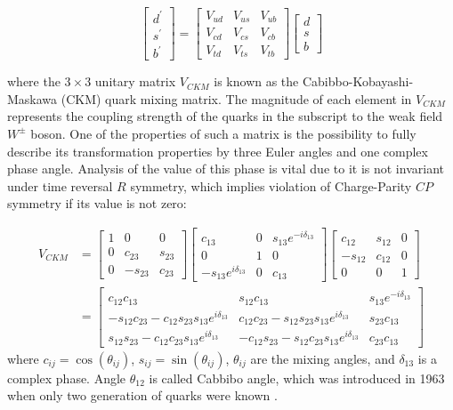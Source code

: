 \begin{equation}
\label{eq:ckm}
  \begin{bmatrix}  d^\prime  \\  s^\prime  \\  b^\prime  \end{bmatrix} = \begin{bmatrix} V_{ud} & V_{us} & V_{ub} \\ V_{cd} & V_{cs} & V_{cb} \\ V_{td} & V_{ts} & V_{tb} \end{bmatrix} \begin{bmatrix}  d  \\  s  \\  b  \end{bmatrix}
\end{equation}


where the $3 \times 3$ unitary matrix $V_{CKM}$ is known as the Cabibbo-Kobayashi-Maskawa (CKM) quark mixing matrix\cite{}\cite{}. The magnitude of each element in $V_{CKM}$ represents the coupling strength of the quarks in the subscript to the weak field $W^{\pm}$ boson.  One of the properties of such a matrix is the possibility to fully describe its transformation properties by three Euler angles and one complex phase angle. Analysis of the value of this phase is vital due to it is not invariant under time reversal $R$ symmetry, which implies violation of Charge-Parity $CP$ symmetry if its value is not zero:

\begin{align} V_{CKM}  &= \begin{bmatrix} 1 & 0 & 0 \\ 0 & c_{23} & s_{23} \\ 0 & -s_{23} & c_{23} \end{bmatrix}
 \begin{bmatrix} c_{13} & 0 & s_{13}e^{-i\delta_{13}} \\ 0 & 1 & 0 \\ -s_{13}e^{i\delta_{13}} & 0 & c_{13} \end{bmatrix}
 \begin{bmatrix} c_{12} & s_{12} & 0 \\ -s_{12} & c_{12} & 0 \\ 0 & 0 & 1 \end{bmatrix} \nonumber \\ 
 & = \begin{bmatrix} c_{12}c_{13} & s_{12} c_{13} & s_{13}e^{-i\delta_{13}} \\
 -s_{12}c_{23} - c_{12}s_{23}s_{13}e^{i\delta_{13}} & c_{12}c_{23} - s_{12}s_{23}s_{13}e^{i\delta_{13}} & s_{23}c_{13}\\
 s_{12}s_{23} - c_{12}c_{23}s_{13}e^{i\delta_{13}} & -c_{12}s_{23} - s_{12}c_{23}s_{13}e^{i\delta_{13}} & c_{23}c_{13} \end{bmatrix}
\end{align}
where $c_{ij} =\cos(\theta_{ij})$, $s_{ij} =\sin(\theta_{ij})$,  $\theta_{ij}$ are the mixing angles, and $\delta_{13}$ is a complex phase. Angle $\theta_{12}$ is called Cabbibo angle, which was introduced in 1963 when only two generation of quarks were known \cite{cabibbo}. 


